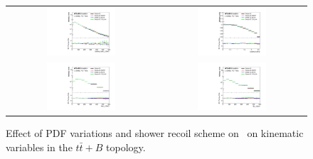 \begin{figure}[p]
\begin{center}
\begin{tabular}{cc}
\includegraphics[width=0.48\textwidth]{Modeling/Figures/other_tt1gbbq_q1_pt_norm} &
\includegraphics[width=0.48\textwidth]{Modeling/Figures/other_tt1gbbq_q1_eta_norm} \\
\includegraphics[width=0.48\textwidth]{Modeling/Figures/other_tt1gbbq_top_pt_norm} &
\includegraphics[width=0.48\textwidth]{Modeling/Figures/other_tt1gbbq_ttbar_pt_norm} \\
\end{tabular}
\caption{Effect of PDF variations and shower recoil scheme  on \ShOL\ on kinematic variables in the $t\bar{t}+B$ topology.}
\label{fig:other_tt1gbb}
\end{center}
\end{figure}
